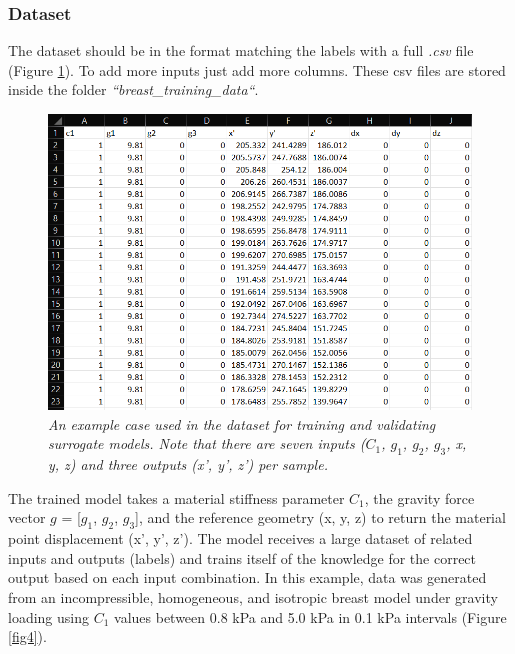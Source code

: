 \documentclass[11pt]{article}
\begin{document}
\subsubsection{Dataset}
The dataset should be in the format matching the labels with a full \textit{.csv} file (Figure \ref{fig3}). To add more inputs just add more columns. These csv files are stored inside the folder \textit{``breast\_training\_data``}.

\begin{figure}
\centering
\includegraphics[scale=0.7]{Images/breast/machine_learning/training_data_structure.png}
\caption{\textit{\label{fig3}An example case used in the dataset for training and validating surrogate models. Note that there are seven inputs ($C_{1}$, $g_{1}$, $g_{2}$, $g_{3}$, x, y, z) and three outputs (x', y', z') per sample.}}
\end{figure}

The trained model takes a material stiffness parameter $C_{1}$, the gravity force vector $g$ = [$g_{1}$, $g_{2}$, $g_{3}$], and the reference geometry (x, y, z) to return the material point displacement (x', y', z'). The model receives a large dataset of related inputs and outputs (labels) and trains itself of the knowledge for the correct output based on each input combination. In this example, data was generated from an incompressible, homogeneous, and isotropic breast model under gravity loading using $C_{1}$ values between 0.8 kPa and 5.0 kPa in 0.1 kPa intervals (Figure \ref{fig4}).
\end{document}
